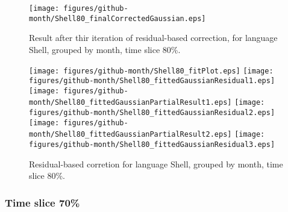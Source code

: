 \begin{figure}[]
\centering
{\texttt{[image: figures/github-month/Shell80\_finalCorrectedGaussian.eps]}}
\caption{Result after thir iteration of residual-based correction, for language Shell, grouped by month, time slice 80\%.}
\end{figure}


\begin{figure}[hb]
\centering
{}
{\texttt{[image: figures/github-month/Shell80\_fitPlot.eps]}}
{\texttt{[image: figures/github-month/Shell80\_fittedGaussianResidual1.eps]}}
{\texttt{[image: figures/github-month/Shell80\_fittedGaussianPartialResult1.eps]}}
{\texttt{[image: figures/github-month/Shell80\_fittedGaussianResidual2.eps]}}
{\texttt{[image: figures/github-month/Shell80\_fittedGaussianPartialResult2.eps]}}
{\texttt{[image: figures/github-month/Shell80\_fittedGaussianResidual3.eps]}}
\caption{Residual-based corretion for language Shell, grouped by month, time slice 80\%.}
\end{figure}


\clearpage 
\newpage 


\FloatBarrier

\subsubsection{Time slice 70\%}

